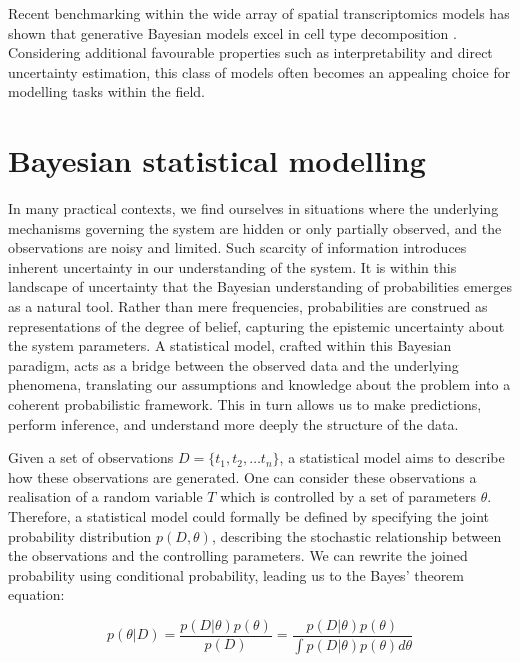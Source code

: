Recent benchmarking within the wide array of spatial transcriptomics models has shown that generative Bayesian models excel in cell type decomposition \parencite{Li2023-ik}. Considering additional favourable properties such as interpretability and direct uncertainty estimation, this class of models often becomes an appealing choice for modelling tasks within the field.

\section{Bayesian statistical modelling}
\label{sec:bayesian-intro}

In many practical contexts, we find ourselves in situations where the underlying mechanisms governing the system are hidden or only partially observed, and the observations are noisy and limited. Such scarcity of information introduces inherent uncertainty in our understanding of the system. It is within this landscape of uncertainty that the Bayesian understanding of probabilities emerges as a natural tool. Rather than mere frequencies, probabilities are construed as representations of the degree of belief, capturing the epistemic uncertainty about the system parameters. A statistical model, crafted within this Bayesian paradigm, acts as a bridge between the observed data and the underlying phenomena, translating our assumptions and knowledge about the problem into a coherent probabilistic framework. This in turn allows us to make predictions, perform inference, and understand more deeply the structure of the data.

Given a set of observations ${D} = \{t_1, t_2, … t_n\}$, a statistical model aims to describe how these observations are generated. One can consider these observations a realisation of a random variable $T$ which is controlled by a set of parameters $\theta$. Therefore, a statistical model could formally be defined by specifying the joint probability distribution $p({D}, \theta)$, describing the stochastic relationship between the observations and the controlling parameters. We can rewrite the joined probability using conditional probability, leading us to the Bayes' theorem equation:

\begin{equation}
p(\theta | {D}) = \frac{p({D} | \theta) p(\theta)}{p({D})} = \frac{p({D} | \theta) p(\theta)}{\int p({D} | \theta) p(\theta) d\theta}
\end{equation}

